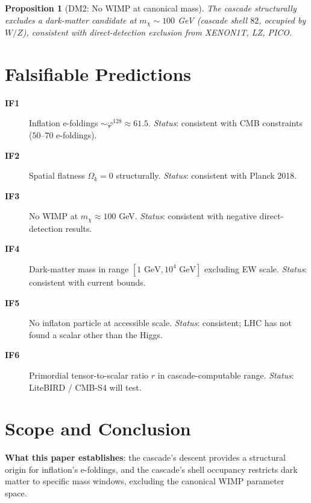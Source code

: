 \documentclass[12pt]{article}
\newtheorem{proposition}[theorem]{Proposition}
\theoremstyle{remark}
\begin{document}
\begin{proposition}[DM2: No WIMP at canonical mass]\label{prop:no-wimp}
The cascade structurally excludes a dark-matter candidate at $m_\chi \sim 100$ GeV (cascade shell $82$, occupied by $W/Z$), consistent with direct-detection exclusion from XENON1T, LZ, PICO.
\end{proposition}

\section{Falsifiable Predictions}\label{sec:predictions}

\begin{description}
\item[\textbf{IF1}] Inflation e-foldings $\sim \varphi^{128} \approx 61.5$. \emph{Status}: consistent with CMB constraints ($50$--$70$ e-foldings).
\item[\textbf{IF2}] Spatial flatness $\Omega_k = 0$ structurally. \emph{Status}: consistent with Planck 2018.
\item[\textbf{IF3}] No WIMP at $m_\chi \approx 100$ GeV. \emph{Status}: consistent with negative direct-detection results.
\item[\textbf{IF4}] Dark-matter mass in range $[1 \text{ GeV}, 10^4 \text{ GeV}]$ excluding EW scale. \emph{Status}: consistent with current bounds.
\item[\textbf{IF5}] No inflaton particle at accessible scale. \emph{Status}: consistent; LHC has not found a scalar other than the Higgs.
\item[\textbf{IF6}] Primordial tensor-to-scalar ratio $r$ in cascade-computable range. \emph{Status}: LiteBIRD / CMB-S4 will test.
\end{description}

\section{Scope and Conclusion}\label{sec:scope}

\textbf{What this paper establishes}: the cascade's descent provides a structural origin for inflation's e-foldings, and the cascade's shell occupancy restricts dark matter to specific mass windows, excluding the canonical WIMP parameter space.
\end{document}
